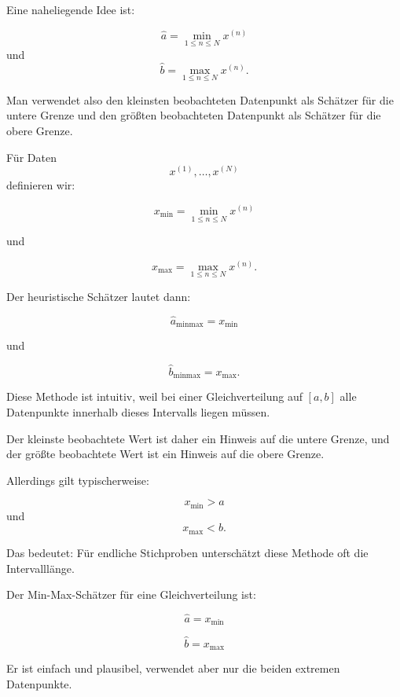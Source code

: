 \documentclass[11pt,a4paper]{scrartcl}
\begin{document}
\begin{notebox}
    Eine naheliegende Idee ist:

    \[
        \hat a = \min_{1 \leq n \leq N} x^{(n)}
    \]
    und
    \[
        \hat b = \max_{1 \leq n \leq N} x^{(n)}.
    \]

    Man verwendet also den kleinsten beobachteten Datenpunkt als Schätzer für
    die untere Grenze und den größten beobachteten Datenpunkt als Schätzer für
    die obere Grenze.
\end{notebox}

\begin{calculationbox}
    Für Daten
    \[
        x^{(1)},\dots,x^{(N)}
    \]
    definieren wir:

    \[
        x_{\min}
        =
        \min_{1 \leq n \leq N} x^{(n)}
    \]

    und

    \[
        x_{\max}
        =
        \max_{1 \leq n \leq N} x^{(n)}.
    \]

    Der heuristische Schätzer lautet dann:

    \[
        \boxed{
            \hat a_{\mathrm{minmax}}
            =
            x_{\min}
        }
    \]

    und

    \[
        \boxed{
            \hat b_{\mathrm{minmax}}
            =
            x_{\max}.
        }
    \]
\end{calculationbox}

\begin{solutionbox}
    Diese Methode ist intuitiv, weil bei einer Gleichverteilung auf \([a,b]\)
    alle Datenpunkte innerhalb dieses Intervalls liegen müssen.

    Der kleinste beobachtete Wert ist daher ein Hinweis auf die untere Grenze,
    und der größte beobachtete Wert ist ein Hinweis auf die obere Grenze.

    Allerdings gilt typischerweise:

    \[
        x_{\min} > a
    \]
    und
    \[
        x_{\max} < b.
    \]

    Das bedeutet: Für endliche Stichproben unterschätzt diese Methode oft die
    Intervalllänge.
\end{solutionbox}

\begin{answerbox}
    Der Min-Max-Schätzer für eine Gleichverteilung ist:

    \[
        \boxed{
            \hat a = x_{\min}
        }
    \]

    \[
        \boxed{
            \hat b = x_{\max}
        }
    \]

    Er ist einfach und plausibel, verwendet aber nur die beiden extremen
    Datenpunkte.
\end{answerbox}
\end{document}
